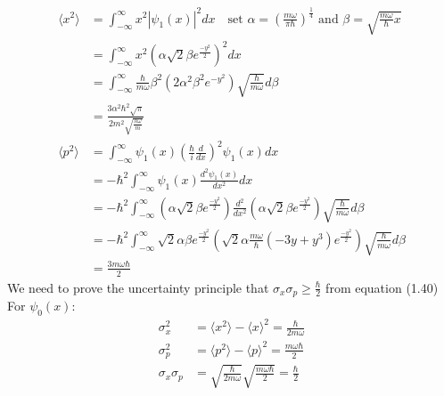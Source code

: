 \documentclass{article}
\begin{document}
\begin{align*}
	\langle x^2 \rangle & = \int_{-\infty}^{\infty} x^2 |\psi_1(x)|^2 dx \quad \text{set \(\alpha = \left(\frac{m \omega}{\pi \hbar}\right)^{\frac{1}{4}}\) and \(\beta = \sqrt{\frac{m\omega}{\hbar}x}\)}                  \\
	                    & = \int_{-\infty}^{\infty} x^2 \left(\alpha \sqrt{2}\beta e^{\frac{-y^2}{2}}\right)^2dx                                                                                                            \\
	                    & = \int_{-\infty}^{\infty} \frac{\hbar}{m \omega} \beta^2 (2\alpha^2 \beta^2 e^{-y^2}) \sqrt{\frac{\hbar}{m \omega}} d\beta                                                                        \\
	                    & =  \frac{3 \alpha^2 \hbar^2 \sqrt{\pi}}{2m^2 \sqrt{\frac{h \omega}{m}}}                                                                                                                           \\
	\langle p^2 \rangle & = \int_{-\infty}^{\infty} \psi_1(x) \left(\frac{\hbar}{i} \frac{d}{dx}\right)^2 \psi_1(x) dx                                                                                                      \\
	                    & = -\hbar^2 \int_{-\infty}^{\infty} \psi_1(x) \frac{d^2 \psi_1(x)}{dx^2} dx                                                                                                                        \\
	                    & = -\hbar^2 \int_{-\infty}^{\infty} \left(\alpha \sqrt{2}\beta e^{\frac{-y^2}{2}}\right) \frac{d^2}{dx^2} \left(\alpha \sqrt{2}\beta e^{\frac{-y^2}{2}}\right) \sqrt{\frac{\hbar}{m \omega}}d\beta \\
	                    & = -\hbar^2 \int_{-\infty}^{\infty} \sqrt{2} \alpha \beta e^{\frac{-y^2}{2}} \left(\sqrt{2} \alpha \frac{m \omega}{\hbar} (-3y + y^3)e^{\frac{-y^2}{2}}\right)\sqrt{\frac{\hbar}{m \omega}}d\beta  \\
	                    & = \frac{3 m \omega \hbar}{2}
\end{align*}
We need to prove the uncertainty principle that \(\sigma_x \sigma_p \ge \frac{\hbar}{2}\) from equation (1.40)\\
For \(\psi_0(x)\):
\begin{align*}
	\sigma_x^2        & = \langle x^2 \rangle - \langle x \rangle^2 = \frac{\hbar}{2m \omega}              \\
	\sigma_p^2        & = \langle p^2 \rangle - \langle p \rangle^2 = \frac{m \omega \hbar}{2}             \\
	\sigma_x \sigma_p & = \sqrt{\frac{\hbar}{2m \omega}} \sqrt{\frac{m \omega \hbar}{2}} = \frac{\hbar}{2}
\end{align*}
\end{document}
